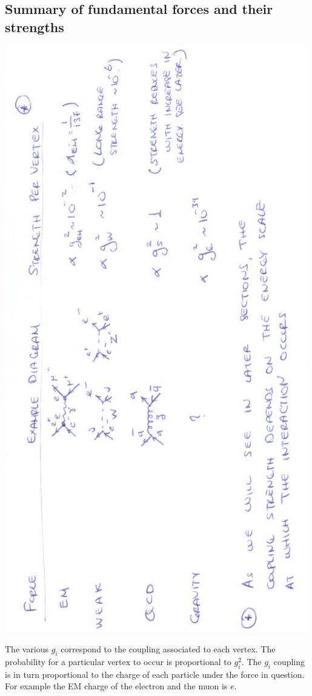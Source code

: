 \subsection{Summary of fundamental forces and their strengths}
\begin{center}
\includegraphics[angle=270,width=0.99\textwidth]{fig/forcerange/forces.jpg}
\end{center}
The various $g_i$ correspond to the coupling associated to each vertex. The probability for a particular vertex to occur is proportional to $g_{i}^2$. The $g_i$ coupling is in turn proportional to the charge of each particle under the force in question. For example the EM charge of the electron and the muon is $e$. 

